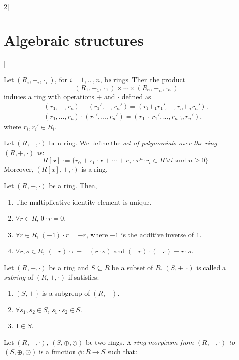 \documentclass[../../../main.tex]{subfiles}
\begin{document}
\begin{multicols}{2}[\section{Algebraic structures}]
\begin{prop}
    Let $(R_i,+_i,\cdot_i)$, for $i=1,\ldots, n$, be rings. Then the product $$(R_1,+_1,\cdot_1)\times\cdots\times(R_n,+_n,\cdot_n)$$ induces a ring with operations $+$ and $\cdot$ defined as
    \begin{gather*}
        (r_1,\ldots,r_n)+(r_1',\ldots,r_n')=(r_1+_1r_1',\ldots,r_n+_nr_n'),\\
        (r_1,\ldots,r_n)\cdot(r_1',\ldots,r_n')=(r_1\cdot_1r_1',\ldots,r_n\cdot_nr_n'),
    \end{gather*}
    where $r_i,r_i'\in R_i$.
\end{prop}
\begin{prop}
    Let $(R,+,\cdot)$ be a ring. We define the  \textit{set of polynomials over the ring $(R,+,\cdot)$} as: $$R[x]:=\{r_0+r_1\cdot x+\cdots+r_n\cdot x^n:r_i\in R\ \forall i\text{ and }n\geq 0\}.$$ Moreover, $(R[x],+,\cdot)$ is a ring.
\end{prop}
\begin{lemma}
    Let $(R,+,\cdot)$ be a ring. Then,
    \begin{enumerate}
        \item The multiplicative identity element is unique.
        \item $\forall r\in R$, $0\cdot r=0$.
        \item $\forall r\in R$, $(-1)\cdot r=-r$, where $-1$ is the additive inverse of 1.
        \item $\forall r,s\in R$, $(-r)\cdot s=-(r\cdot s)$ and $(-r)\cdot (-s)=r\cdot s$.
    \end{enumerate}
\end{lemma}
\begin{definition}[Subring]
    Let $(R,+,\cdot)$ be a ring and $S\subseteq R$ be a subset of $R$. $(S,+,\cdot)$ is called a \textit{subring} of $(R,+,\cdot)$ if satisfies:
    \begin{enumerate}
        \item $(S,+)$ is a subgroup of $(R,+)$.
        \item $\forall s_1,s_2\in S$, $s_1\cdot s_2\in S$.
        \item $1\in S$.
    \end{enumerate}
\end{definition}
\begin{definition}
    Let $(R,+,\cdot)$, $(S,\oplus,\odot)$ be two rings. A \textit{ring morphism from $(R,+,\cdot)$ to $(S,\oplus,\odot)$} is a function $\phi:R\rightarrow S$ such that:
    \begin{enumerate}

\end{enumerate}
\end{definition}
\end{multicols}
\end{document}
